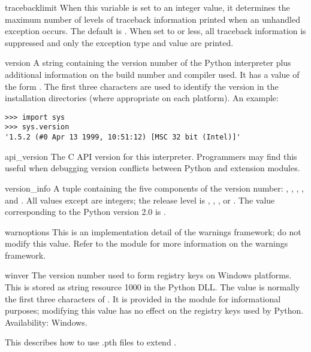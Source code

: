 \begin{datadesc}{tracebacklimit}
  When this variable is set to an integer value, it determines the
  maximum number of levels of traceback information printed when an
  unhandled exception occurs.  The default is .  When set
  to  or less, all traceback information is suppressed and
  only the exception type and value are printed.
\end{datadesc}

\begin{datadesc}{version}
  A string containing the version number of the Python interpreter
  plus additional information on the build number and compiler used.
  It has a value of the form .  The first three characters are used to identify
  the version in the installation directories (where appropriate on
  each platform).  An example:

\begin{verbatim}
>>> import sys
>>> sys.version
'1.5.2 (#0 Apr 13 1999, 10:51:12) [MSC 32 bit (Intel)]'
\end{verbatim}
\end{datadesc}

\begin{datadesc}{api_version}
  The C API version for this interpreter.  Programmers may find this useful
  when debugging version conflicts between Python and extension
  modules. 
\end{datadesc}

\begin{datadesc}{version_info}
  A tuple containing the five components of the version number:
  , , , , and
  .  All values except  are integers;
  the release level is , ,
  , or .  The 
  value corresponding to the Python version 2.0 is .
\end{datadesc}

\begin{datadesc}{warnoptions}
  This is an implementation detail of the warnings framework; do not
  modify this value.  Refer to the  module for
  more information on the warnings framework.
\end{datadesc}

\begin{datadesc}{winver}
  The version number used to form registry keys on Windows platforms.
  This is stored as string resource 1000 in the Python DLL.  The value
  is normally the first three characters of .  It is
  provided in the  module for informational purposes;
  modifying this value has no effect on the registry keys used by
  Python.
  Availability: Windows.
\end{datadesc}


\begin{seealso}
    {This describes how to use .pth files to extend .}
\end{seealso}

